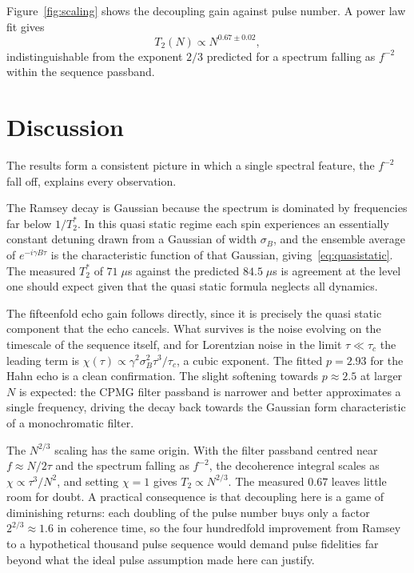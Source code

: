 \documentclass[conference]{IEEEtran}
\begin{document}
Figure~\ref{fig:scaling} shows the decoupling gain against pulse number. A power
law fit gives
\begin{equation}
T_2(N) \propto N^{0.67 \pm 0.02},
\end{equation}
indistinguishable from the exponent $2/3$ predicted for a spectrum falling as
$f^{-2}$ within the sequence passband.

\section{Discussion}\label{sec:discussion}

The results form a consistent picture in which a single spectral feature, the
$f^{-2}$ fall off, explains every observation.

The Ramsey decay is Gaussian because the spectrum is dominated by frequencies far
below $1/T_2^{*}$. In this quasi static regime each spin experiences an
essentially constant detuning drawn from a Gaussian of width $\sigma_B$, and the
ensemble average of $e^{-i\gamma B\tau}$ is the characteristic function of that
Gaussian, giving~\eqref{eq:quasistatic}. The measured $T_2^{*}$ of $71\;\mu$s
against the predicted $84.5\;\mu$s is agreement at the level one should expect
given that the quasi static formula neglects all dynamics.

The fifteenfold echo gain follows directly, since it is precisely the quasi static
component that the echo cancels. What survives is the noise evolving on the
timescale of the sequence itself, and for Lorentzian noise in the limit
$\tau \ll \tau_c$ the leading term is
$\chi(\tau) \propto \gamma^2 \sigma_B^2 \tau^3/\tau_c$, a cubic exponent. The
fitted $p = 2.93$ for the Hahn echo is a clean confirmation. The slight softening
towards $p \approx 2.5$ at larger $N$ is expected: the CPMG filter passband is
narrower and better approximates a single frequency, driving the decay back
towards the Gaussian form characteristic of a monochromatic filter.

The $N^{2/3}$ scaling has the same origin. With the filter passband centred near
$f \approx N/2\tau$ and the spectrum falling as $f^{-2}$, the decoherence integral
scales as $\chi \propto \tau^3/N^2$, and setting $\chi = 1$ gives
$T_2 \propto N^{2/3}$. The measured $0.67$ leaves little room for doubt. A
practical consequence is that decoupling here is a game of diminishing returns:
each doubling of the pulse number buys only a factor $2^{2/3} \approx 1.6$ in
coherence time, so the four hundredfold improvement from Ramsey to a
hypothetical thousand pulse sequence would demand pulse fidelities far beyond what
the ideal pulse assumption made here can justify.
\end{document}
